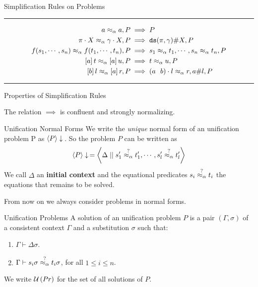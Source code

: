 \documentclass{beamer}
\begin{document}
    \begin{frame}{Simplification Rules on Problems}
        \begin{table}[ht]
            {\small
                \hrule
                \vspace{10pt}
                \begin{align*}
                    a \mathrel{\approx_\alpha} a, P                                     & \implies P                                                 \\
                    \pi \cdot X \mathrel{\approx_\alpha} \gamma \cdot X, P    & \implies \mathtt{ds}(\pi,\gamma)\# X, P                     \\
                    f(s_1, \cdots, s_n) \mathrel{\approx_\alpha} f(t_1, \cdots, t_n), P & \implies s_1 \mathrel{\approx_\alpha} t_1, \cdots, s_n \mathrel{\approx_\alpha} t_n, P             \\
                    \left[ a \right]t \mathrel{\approx_\alpha} \left[ a \right]u, P                   & \implies t \mathrel{\approx_\alpha} u, P                                       \\
                    \left[ b \right]l \mathrel{\approx_\alpha} \left[ a \right]r, P                   & \implies (a \ \ b) \cdot l \mathrel{\approx_\alpha} r, a \# l,P
                \end{align*}
                \hrule
            }
            \caption{Simplification rules for $\alpha$-equivalence}
            \label{table:simplification-rules-alpha-equiv}
        \end{table}
    \end{frame}

    \begin{frame}{Properties of Simplification Rules}
        \begin{lemma}
            The relation $\implies$ is confluent and strongly normalizing.
        \end{lemma}
    \end{frame}

    \begin{frame}{Unification Normal Forms}
        We write the \textit{unique} normal form of an unification problem P as $\left\langle P \right\rangle\downarrow\,$. So the problem $P$ can be written as
        $$\left\langle P \right\rangle\downarrow\, = \left\langle \Delta \mid\mid s_1' \overset{?}{\mathrel{\approx_\alpha}} t_1', \cdots, s_l' \overset{?}{\mathrel{\approx_\alpha}} t_l' \right\rangle$$
        We call $\Delta$ an \textbf{initial context} and the equational predicates $s_i \overset{?}{\mathrel{\approx_\alpha}} t_i$ the equations that remains to be solved.

        From now on we always consider problems in normal forms.
    \end{frame}

    \begin{frame}{Unification Problems}
        A solution of an unification problem $P$ is a pair $(\Gamma, \sigma)$ of a consistent context $\Gamma$ and a substitution $\sigma$ such that:
        \begin{enumerate}
            \item $\Gamma \vdash \Delta \sigma$.
            \item $\Gamma \vdash s_i \sigma \overset{?}{\mathrel{\approx_\alpha}} t_i \sigma$, for all $1 \leq i \leq n$.
        \end{enumerate}
        We write $\mathcal{U}\left(Pr\right)$ for the set of all solutions of $P$.
    \end{frame}
\end{document}
